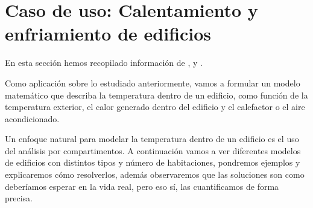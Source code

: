 \chapter{Caso de uso: Calentamiento y enfriamiento de edificios}
En esta sección hemos recopilado información de \cite{Campos}, \cite{Nagle} y \cite{tfm}.

Como aplicación sobre lo estudiado anteriormente, vamos a formular un modelo matemático que describa la temperatura dentro de un edificio, como función de la temperatura exterior, el calor generado dentro del edificio y el calefactor o el aire acondicionado.

Un enfoque natural para modelar la temperatura dentro de un edificio es el uso del análisis por compartimentos. A continuación vamos a ver diferentes modelos de edificios con distintos tipos y número de habitaciones, pondremos ejemplos y explicaremos cómo resolverlos, además observaremos que las soluciones son como deberíamos esperar en la vida real, pero eso sí, las cuantificamos de forma precisa.
